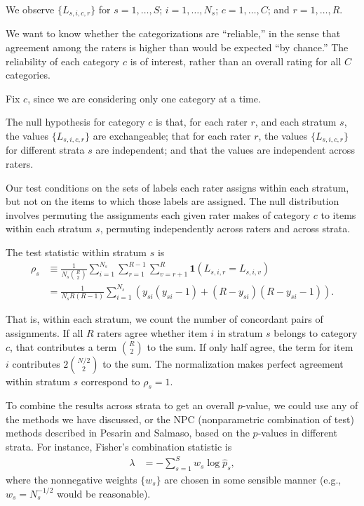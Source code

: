 \documentclass[]{article}
\begin{document}
We observe $\{ L_{s,i,c,r} \}$ for $s=1, \dots, S$;  $i=1, \dots, N_s$;
$c=1, \dots, C$; and $r=1, \dots, R$.

We want to know whether the categorizations are ``reliable,'' in the sense that
agreement among the raters is higher than would be expected ``by chance.''
The reliability of each category $c$ is of interest, rather than an overall
rating for all $C$ categories.

Fix $c$, since we are considering only one category at a time.

The null hypothesis for category $c$ is that, for each rater $r$, and each
stratum $s$, the values $\{ L_{s,i,c,r} \}$ are exchangeable; that for each
rater $r$, the values $\{ L_{s,i,c,r} \}$ for different strata $s$ are
independent; and that the values are independent across raters.

Our test conditions on the sets of labels each rater assigns within each
stratum, but not on the items to which those labels are assigned.
The null distribution involves permuting the assignments each given rater makes
of category $c$ to items within each stratum $s$, permuting independently
across raters and across strata.

The test statistic within stratum $s$ is
\begin{align*}
\rho_s &\equiv \frac{1}{N_s {R \choose 2}} \sum_{i=1}^{N_s}
              \sum_{r=1}^{R-1} \sum_{v=r+1}^R \mathbf{1}(L_{s,i,r} = L_{s,i,v}) \\
              &= \frac{1}{N_s R(R-1)} \sum_{i=1}^{N_s}
                (y_{si}(y_{si}-1) + (R-y_{si})(R-y_{si}-1)).
\end{align*}

That is, within each stratum, we count the number of concordant pairs of
assignments.
If all $R$ raters agree whether item $i$ in stratum $s$ belongs to category
$c$, that contributes a term ${R \choose 2}$ to the sum.
If only half agree, the term for item $i$ contributes $2 {N/2 \choose 2}$ to
the sum.
The normalization makes perfect agreement within stratum $s$ correspond to
$\rho_s = 1$.

To combine the results across strata to get an overall $p$-value, we could
use any of the methods we have discussed, or the NPC (nonparametric
combination of test) methods described in Pesarin and Salmaso, based on
the $p$-values in different strata.
For instance, Fisher's combination statistic is
\begin{align*}
    \lambda &= - \sum_{s=1}^S w_s \log \hat{p}_s,
\end{align*}
where the nonnegative weights $\{w_s\}$ are chosen in some sensible manner
(e.g., $w_s = N_s^{-1/2}$ would be reasonable).
\end{document}
